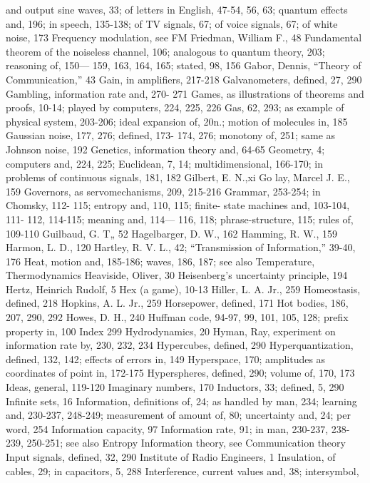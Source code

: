 {{{{{{{{{{{{{{{and output sine waves, 33; of
letters in English, 47-54, 56, 63;
quantum effects and, 196; in speech,
135-138; of TV signals, 67; of voice
signals, 67; of white noise, 173
Frequency modulation, see FM
Friedman, William F., 48
Fundamental theorem of the noiseless
channel, 106; analogous to quantum
theory, 203; reasoning of, 150—
159, 163, 164, 165; stated, 98, 156
Gabor, Dennis, “Theory of Communication,”
43
Gain, in amplifiers, 217-218
Galvanometers, defined, 27, 290
Gambling, information rate and, 270-
271
Games, as illustrations of theorems and
proofs, 10-14; played by computers,
224, 225, 226
Gas, 62, 293; as example of physical
system, 203-206; ideal expansion
of, 20n.; motion of molecules in,
185
Gaussian noise, 177, 276; defined, 173-
174, 276; monotony of, 251; same
as Johnson noise, 192
Genetics, information theory and, 64-65
Geometry, 4; computers and, 224, 225;
Euclidean, 7, 14; multidimensional,
166-170; in problems of continuous
signals, 181, 182
Gilbert, E. N.,xi
Go lay, Marcel J. E., 159
Governors, as servomechanisms, 209,
215-216
Grammar, 253-254; in Chomsky, 112-
115; entropy and, 110, 115; finite-
state machines and, 103-104, 111-
112, 114-115; meaning and, 114—
116, 118; phrase-structure, 115;
rules of, 109-110
Guilbaud, G. T„ 52
Hagelbarger, D. W., 162
Hamming, R. W., 159
Harmon, L. D., 120
Hartley, R. V. L., 42; “Transmission of
Information,” 39-40, 176
Heat, motion and, 185-186; waves, 186,
187; see also Temperature, Thermodynamics
Heaviside, Oliver, 30
Heisenberg’s uncertainty principle, 194
Hertz, Heinrich Rudolf, 5
Hex (a game), 10-13
Hiller, L. A. Jr., 259
Homeostasis, defined, 218
Hopkins, A. L. Jr., 259
Horsepower, defined, 171
Hot bodies, 186, 207, 290, 292
Howes, D. H., 240
Huffman code, 94-97, 99, 101, 105, 128;
prefix property in, 100
Index 299
Hydrodynamics, 20
Hyman, Ray, experiment on information
rate by, 230, 232, 234
Hypercubes, defined, 290
Hyperquantization, defined, 132, 142;
effects of errors in, 149
Hyperspace, 170; amplitudes as coordinates
of point in, 172-175
Hyperspheres, defined, 290; volume of,
170, 173
Ideas, general, 119-120
Imaginary numbers, 170
Inductors, 33; defined, 5, 290
Infinite sets, 16
Information, definitions of, 24; as handled
by man, 234; learning and,
230-237, 248-249; measurement of
amount of, 80; uncertainty and,
24; per word, 254
Information capacity, 97
Information rate, 91; in man, 230-237,
238-239, 250-251; see also Entropy
Information theory, see Communication
theory
Input signals, defined, 32, 290
Institute of Radio Engineers, 1
Insulation, of cables, 29; in capacitors,
5, 288
Interference, current values and, 38; intersymbol,
}}}}}}}}}}}}}}}
